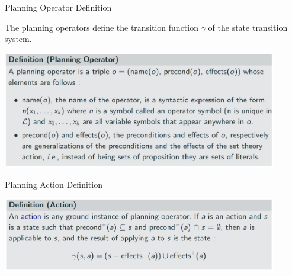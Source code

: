 \documentclass[9pt]{beamer}
\begin{document}
\begin{frame}{Planning Operator Definition}
\begin{small}

The planning operators define the transition function $\gamma$ of the state transition system.

\begin{center}
\includegraphics[keepaspectratio, width=0.90\textwidth]{images/automated_planning_operator_def.jpg}
\end{center}


\end{small}
\end{frame}

\begin{frame}{Planning Action Definition}
\begin{small}

\begin{center}
\includegraphics[keepaspectratio, width=0.90\textwidth]{images/automated_planning_action_def.jpg}
\end{center}

\end{small}
\end{frame}
\end{document}
